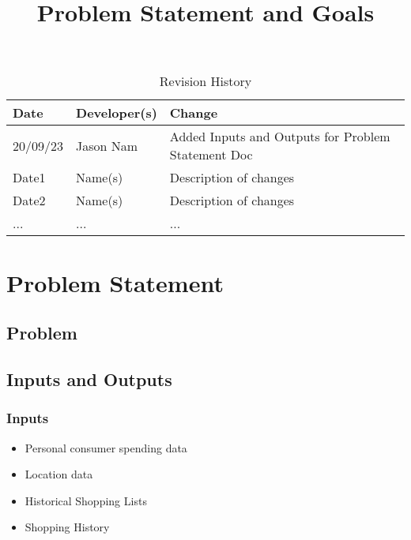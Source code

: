 \documentclass{article}
\title{Problem Statement and Goals\\\progname}
\author{\authname}
\date{}
\begin{document}
\maketitle

\begin{table}[hp]
\caption{Revision History} \label{TblRevisionHistory}
\begin{tabularx}{\textwidth}{llX}
\toprule
\textbf{Date} & \textbf{Developer(s)} & \textbf{Change}\\
\midrule
20/09/23 & Jason Nam & Added Inputs and Outputs for Problem Statement Doc\\
Date1 & Name(s) & Description of changes\\
Date2 & Name(s) & Description of changes\\
... & ... & ...\\
\bottomrule
\end{tabularx}
\end{table}

\section{Problem Statement}


\subsection{Problem}

\subsection{Inputs and Outputs}

\subsubsection{Inputs}
    \begin{itemize}
        \item Personal consumer spending data
        \item Location data
        \item Historical Shopping Lists
        \item Shopping History
    \end{itemize}
\end{document}

